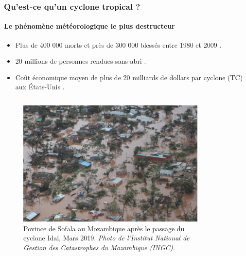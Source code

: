 \documentclass[aspectratio=169, usepdftitle=false, xcolor={dvipsnames}, 9pt,table]{beamer}
\begin{document}
\begin{frame}[c]
    \frametitle{Qu'est-ce qu'un cyclone tropical ?}
    \framesubtitle{Le phénomène météorologique le plus destructeur}
    \begin{definition}
        \footnotesize
        \begin{itemize}
            \item Plus de 400 000 morts et près de 300 000 blessés entre 1980 et 2009 \parencite{doocy_human_2013}.
            \item 20 millions de personnes rendues sans-abri \parencite{doocy_human_2013}.
            \item Coût économique moyen de plus de 20 milliards de dollars par cyclone (TC) aux États-Unis \parencite{smith_billiondollar_2020}.
        \end{itemize} 
    \end{definition}
    \begin{columns}
        \begin{column}{0.45\textwidth}
            \begin{figure}[h]
                \centering
                \includegraphics[width=0.97\textwidth]{Figures/idai_2019_sofala_province.jpg}
                \caption{Povince de Sofala au Mozambique après le passage du \mbox{cyclone} Idai, Mars 2019. \textit{Photo de l'Institut National
                de Gestion des Catastrophes du Mozambique (INGC).}}
            \end{figure}
        \end{column}
        \begin{column}{0.45\textwidth}
             \begin{figure}[h]

\end{figure}
\end{column}
\end{columns}
\end{frame}
\end{document}
